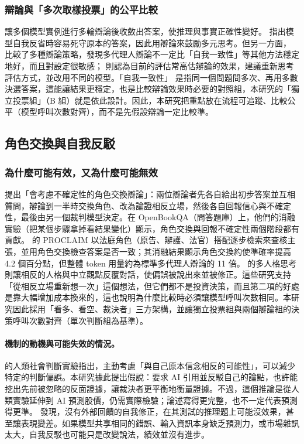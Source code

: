 \documentclass[12pt,a4paper]{article}
\numberwithin{table}{section}
\numberwithin{figure}{section}
\begin{document}
\subsubsection{辯論與「多次取樣投票」的公平比較}
\citet{du2023debate} 讓多個模型實例進行多輪辯論後收斂出答案，使推理與事實正確性變好。\citet{liang2023divergent} 指出模型自我反省時容易死守原本的答案，因此用辯論來鼓勵多元思考。但另一方面，\citet{smit2023mad} 比較了多種辯論策略，發現多代理人辯論不一定比「自我一致性」等其他方法穩定地好，而且對設定很敏感；\citet{zhang2025stop} 則認為目前的評估常高估辯論的效果，建議重新思考評估方式，並改用不同的模型。「自我一致性」\citep{wang2023selfconsistency} 是指同一個問題問多次、再用多數決選答案，這能讓結果更穩定，也是比較辯論效果時必要的對照組，本研究的「獨立投票組」（B 組）就是依此設計。因此，本研究把重點放在流程可追蹤、比較公平（模型呼叫次數對齊），而不是先假設辯論一定比較準。
\subsection{角色交換與自我反駁}

\subsubsection{為什麼可能有效，又為什麼可能無效}
\citet{liu2025roleswitch} 提出「會考慮不確定性的角色交換辯論」：兩位辯論者先各自給出初步答案並互相質問，辯論到一半時交換角色、改為論證相反立場，然後各自回報信心與不確定性，最後由另一個裁判模型決定。在 OpenBookQA（問答題庫）上，他們的消融實驗（把某個步驟拿掉看結果變化）顯示，角色交換與回報不確定性兩個階段都有貢獻。\citet{chowdhury2026proclaim} 的 PROCLAIM 以法庭角色（原告、辯護、法官）搭配逐步檢索來查核主張，並用角色交換檢查答案是否一致；其消融結果顯示角色交換約使準確率提高 4.2 個百分點，但整體 token 用量約為標準多代理人辯論的 11 倍。\citet{chen2026mpt} 的多人格思考則讓相反的人格與中立觀點反覆對話，使偏誤被說出來並被修正。這些研究支持「從相反立場重新想一次」這個想法，但它們都不是投資決策，而且第二項的好處是靠大幅增加成本換來的，這也說明為什麼比較時必須讓模型呼叫次數相同。本研究因此採用「看多、看空、裁決者」三方架構，並讓獨立投票組與兩個辯論組的決策呼叫次數對齊（單次判斷組為基準）。\paragraph{機制的動機與可能失效的情況。}
\citet{lord1984opposite} 的人類社會判斷實驗指出，主動考慮「與自己原本信念相反的可能性」，可以減少特定的判斷偏誤。本研究據此提出假說：要求 AI 引用並反駁自己的論點，也許能挖出先前被忽略的反面證據，讓裁決者更平衡地衡量證據。不過，這個推論是從人類實驗延伸到 AI 預測股價，仍需實際檢驗；論述寫得更完整，也不一定代表預測得更準。\citet{huang2024selfcorrect} 發現，沒有外部回饋的自我修正，在其測試的推理題上可能沒效果，甚至讓表現變差。如果模型共享相同的錯誤、輸入資訊本身缺乏預測力，或市場雜訊太大，自我反駁也可能只是改變說法，績效並沒有進步。
\end{document}

